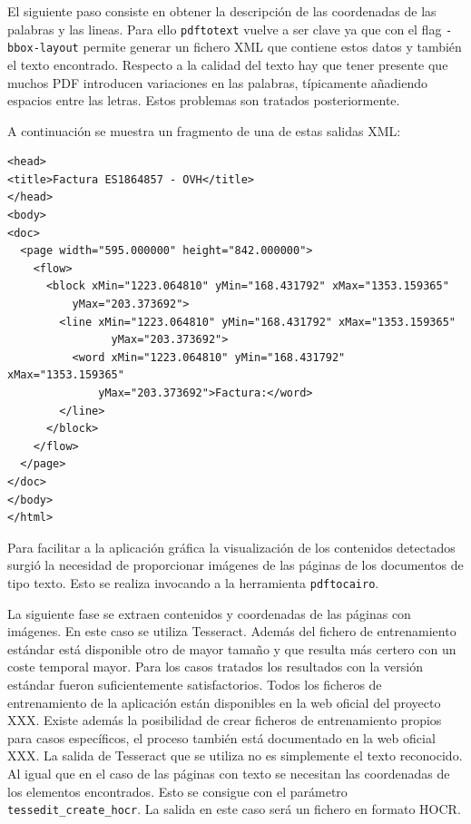 El siguiente paso consiste en obtener la descripción de las coordenadas de las palabras y las lineas. Para ello \verb|pdftotext| vuelve a ser clave ya que con el flag \verb|-bbox-layout| permite generar un fichero XML que contiene estos datos y también el texto encontrado. Respecto a la calidad del texto hay que tener presente que muchos PDF introducen variaciones en las palabras, típicamente añadiendo espacios entre las letras. Estos problemas son tratados posteriormente.

A continuación se muestra un fragmento de una de estas salidas XML:

\begin{verbatim}
<head>
<title>Factura ES1864857 - OVH</title>
</head>
<body>
<doc>
  <page width="595.000000" height="842.000000">
    <flow>
      <block xMin="1223.064810" yMin="168.431792" xMax="1353.159365" 
          yMax="203.373692">
        <line xMin="1223.064810" yMin="168.431792" xMax="1353.159365" 
        	    yMax="203.373692">
          <word xMin="1223.064810" yMin="168.431792" xMax="1353.159365" 
              yMax="203.373692">Factura:</word>
        </line>
      </block>
    </flow>
  </page>
</doc>
</body>
</html>
\end{verbatim}


Para facilitar a la aplicación gráfica la visualización de los contenidos detectados surgió la necesidad de proporcionar imágenes de las páginas de los documentos de tipo texto. Esto se realiza invocando a la herramienta \verb|pdftocairo|. 

La siguiente fase se extraen contenidos y coordenadas de las páginas con imágenes. En este caso se utiliza Tesseract. Además del fichero de entrenamiento estándar está disponible otro de mayor tamaño y que resulta más certero con un coste temporal mayor. Para los casos tratados los resultados con la versión estándar fueron suficientemente satisfactorios. Todos los ficheros de entrenamiento de la aplicación están disponibles en la web oficial del proyecto XXX. Existe además la posibilidad de crear ficheros de entrenamiento propios para casos específicos, el proceso también está documentado en la web oficial XXX. La salida de Tesseract que se utiliza no es simplemente el texto reconocido. Al igual que en el caso de las páginas con texto se necesitan las coordenadas de los elementos encontrados. Esto se consigue con el parámetro \verb|tessedit_create_hocr|. La salida en este caso será un fichero en formato HOCR.

